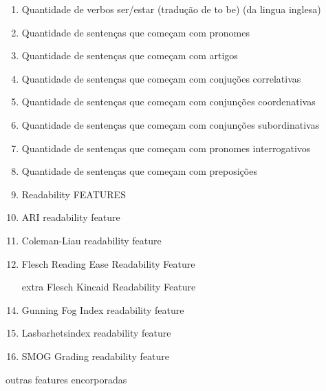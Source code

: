 \begin{enumerate}
    \item Quantidade de verbos ser/estar (tradução de to be) (da lingua inglesa)%

	\item Quantidade de sentenças que começam com pronomes %
	\item Quantidade de sentenças que começam com artigos %
	\item Quantidade de sentenças que começam com conjuções correlativas %
	\item Quantidade de sentenças que começam com conjunções coordenativas %
	\item Quantidade de sentenças que começam com conjunções subordinativas %
	\item Quantidade de sentenças que começam com pronomes interrogativos%
	\item Quantidade de sentenças que começam com preposições %

    \item Readability FEATURES
    \item ARI readability feature
	\item Coleman-Liau readability feature
	\item Flesch Reading Ease Readability Feature
	\item [extra] Flesch Kincaid Readability Feature %
	\item Gunning Fog Index readability feature
	\item Lasbarhetsindex readability feature
	\item SMOG Grading readability feature
\end{enumerate}

outras features encorporadas

